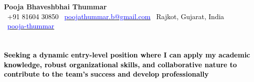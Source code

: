 \documentclass[a4paper,10pt]{article}
\begin{document}
\pagestyle{empty}

\begin{center}
    {\Huge \textbf{Pooja Bhaveshbhai Thummar}}\\
    \vspace{2mm}
    \textcolor{black}{\ +91 81604 30850 \textbullet{} \faEnvelope[regular]\ \href{mailto:poojathummar.b@gmail.com}{\textcolor{blue}{poojathummar.b@gmail.com}} \textbullet{} \faMapMarker*[regular]\ Rajkot, Gujarat, India} \\
    \textcolor{black}{\faLinkedinIn\ \href{https://www.linkedin.com/in/pooja-thummar-b903a2289}{\textcolor{blue}{pooja-thummar}}}
\end{center}

\section*{}
\textcolor{black}{\textbf{Seeking a dynamic entry-level position where I can apply my academic knowledge, robust organizational skills, and collaborative nature to contribute to the team's success and develop professionally}}
\end{document}

